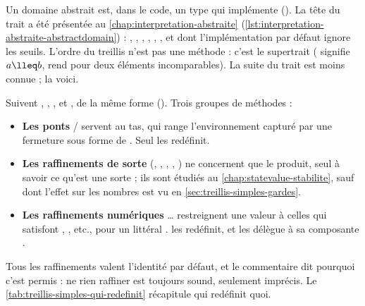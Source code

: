 Un domaine abstrait est, dans le code, un type qui implémente
 (). La tête du trait a été
présentée au \cref{chap:interpretation-abstraite}
(\cref{lst:interpretation-abstraite-abstractdomain}) : ,
, , , , , et
 dont l'implémentation par défaut ignore les seuils. L'ordre du
treillis n'est pas une méthode : c'est le supertrait 
( signifie $a \lleq b$,  rend  pour
deux éléments incomparables). La suite du trait est moins connue ; la voici.


Suivent , , ,
 et , de la même forme
(). Trois groupes de méthodes :
\begin{itemize}
  \item \textbf{Les ponts}  / 
    servent au tas, qui range l'environnement capturé par une fermeture sous
    forme de . Seul  les redéfinit.
  \item \textbf{Les raffinements de sorte} (,
    , ,
    , ) ne concernent que le produit,
    seul à savoir ce qu'est une sorte ; ils sont étudiés au
    \cref{chap:statevalue-stabilite}, sauf  dont l'effet
    sur les nombres est vu en \cref{sec:treillis-simples-gardes}.
  \item \textbf{Les raffinements numériques}  \dots{}
     restreignent une valeur à celles qui satisfont
    , , etc., pour un littéral .
     les redéfinit, et  les délègue à sa
    composante .
\end{itemize}

Tous les raffinements valent l'identité par défaut, et le commentaire dit
pourquoi c'est permis : ne rien raffiner est toujours sound, seulement
imprécis. Le \cref{tab:treillis-simples-qui-redefinit} récapitule qui redéfinit
quoi.

